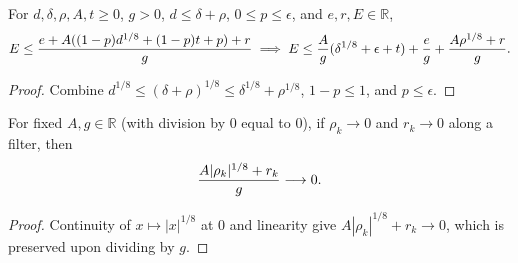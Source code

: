 \begin{lemma}
    \label{thm:arealaw-selected-energy-density}
    \leanok
    For $d,\delta,\rho,A,t\ge0$, $g>0$, $d\le\delta+\rho$, $0\le p\le\epsilon$, and $e,r,E\in\mathbb R$,
    \begin{align}
        E \le\frac{e+A((1-p)d^{1/8}+(1-p)t+p)+r}{g}
        \implies
        E \le\frac A g(\delta^{1/8}+\epsilon+t)
        +\frac e g+\frac{A\rho^{1/8}+r}{g}. \notag
    \end{align}
\end{lemma}
\begin{proof}
    \leanok
    Combine $d^{1/8}\le(\delta+\rho)^{1/8}\le\delta^{1/8}+\rho^{1/8}$, $1-p\le1$, and $p\le\epsilon$.
\end{proof}

\begin{lemma}
    \label{thm:arealaw-selected-energy-vanishing-remainder}
    \leanok
    For fixed $A,g\in\mathbb R$ (with division by $0$ equal to $0$), if $\rho_k\to0$ and $r_k\to0$ along a filter, then
    \begin{align}
        \frac{A|\rho_k|^{1/8}+r_k}{g} \longrightarrow0. \notag
    \end{align}
\end{lemma}
\begin{proof}
    \leanok
    Continuity of $x\mapsto|x|^{1/8}$ at $0$ and linearity give $A|\rho_k|^{1/8}+r_k\to0$, which is preserved upon dividing by $g$.
\end{proof}

